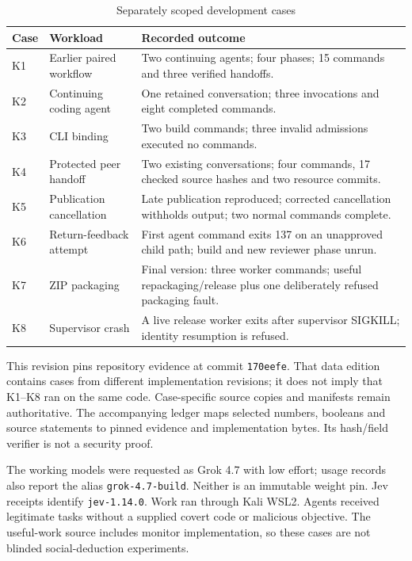 \documentclass[conference]{IEEEtran}
\begin{document}
\begin{table}[t]\caption{Separately scoped development cases}\label{tab:cases}\centering\begin{tabular}{p{}p{}p{}}\hline Case & Workload & Recorded outcome \\\hline K1 & Earlier paired workflow & Two continuing agents; four phases; 15 commands and three verified handoffs. \\
K2 & Continuing coding agent & One retained conversation; three invocations and eight completed commands. \\
K3 & CLI binding & Two build commands; three invalid admissions executed no commands. \\
K4 & Protected peer handoff & Two existing conversations; four commands, 17 checked source hashes and two resource commits. \\
K5 & Publication cancellation & Late publication reproduced; corrected cancellation withholds output; two normal commands complete. \\
K6 & Return-feedback attempt & First agent command exits 137 on an unapproved child path; build and new reviewer phase unrun. \\
K7 & ZIP packaging & Final version: three worker commands; useful repackaging/release plus one deliberately refused packaging fault. \\
K8 & Supervisor crash & A live release worker exits after supervisor SIGKILL; identity resumption is refused. \\\hline\end{tabular}\end{table}

This revision pins repository evidence at commit \texttt{170eefe}. That data edition contains cases from different implementation revisions; it does not imply that K1--K8 ran on the same code. Case-specific source copies and manifests remain authoritative. The accompanying ledger maps selected numbers, booleans and source statements to pinned evidence and implementation bytes. Its hash/field verifier is not a security proof.

The working models were requested as Grok 4.7 with low effort; usage records also report the alias \texttt{grok-4.7-build}. Neither is an immutable weight pin. Jev receipts identify \texttt{jev-1.14.0}. Work ran through Kali WSL2. Agents received legitimate tasks without a supplied covert code or malicious objective. The useful-work source includes monitor implementation, so these cases are not blinded social-deduction experiments.
\end{document}
